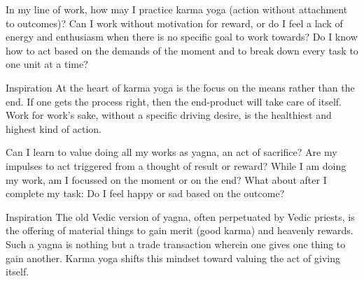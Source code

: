 
\newpage
\begin{mananam}{} 
\mananamtext In my line of work, how may I practice karma yoga (action without attachment to outcomes)? Can I work without motivation for reward, or do I feel a lack of energy and enthusiasm when there is no specific goal to work towards? Do I know how to act based on the demands of the moment and to break down every task to one unit at a time?
\end{mananam}
\WritingHand{}
\begin{inspiration}{\mananamfont Inspiration}
\mananamtext At the heart of karma yoga is the focus on the means rather than the end. If one gets the process right, then the end-product will take care of itself. Work for work’s sake, without a specific driving desire, is the healthiest and highest kind of action.
\end{inspiration}
\newpage

\newpage
\begin{mananam}{} 
\mananamtext Can I learn to value doing all my works as yagna, an act of sacrifice? Are my impulses to act triggered from a thought of result or reward? While I am doing my work, am I focussed on the moment or on the end? What about after I complete my task: Do I feel happy or sad based on the outcome?
\end{mananam}
\WritingHand{}
\begin{inspiration}{\mananamfont Inspiration}
\mananamtext The old Vedic version of yagna, often perpetuated by Vedic priests, is the offering of material things to gain merit (good karma) and heavenly rewards. Such a yagna is nothing but a trade transaction wherein one gives one thing to gain another. Karma yoga shifts this mindset toward valuing the act of giving itself.
\end{inspiration}
\newpage


